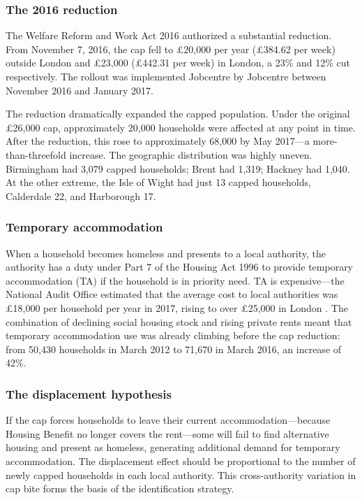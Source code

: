 \documentclass[12pt]{article}
\begin{document}
\subsubsection*{The 2016 reduction} The Welfare Reform and Work Act 2016 authorized a substantial reduction. From November 7, 2016, the cap fell to \pounds20,000 per year (\pounds384.62 per week) outside London and \pounds23,000 (\pounds442.31 per week) in London, a 23\% and 12\% cut respectively. The rollout was implemented Jobcentre by Jobcentre between November 2016 and January 2017.

The reduction dramatically expanded the capped population. Under the original \pounds26,000 cap, approximately 20,000 households were affected at any point in time. After the reduction, this rose to approximately 68,000 by May 2017---a more-than-threefold increase. The geographic distribution was highly uneven. Birmingham had 3,079 capped households; Brent had 1,319; Hackney had 1,040. At the other extreme, the Isle of Wight had just 13 capped households, Calderdale 22, and Harborough 17.

\subsubsection*{Temporary accommodation} When a household becomes homeless and presents to a local authority, the authority has a duty under Part 7 of the Housing Act 1996 to provide temporary accommodation (TA) if the household is in priority need. TA is expensive---the National Audit Office estimated that the average cost to local authorities was \pounds18,000 per household per year in 2017, rising to over \pounds25,000 in London \citep{nao2017homelessness}. The combination of declining social housing stock and rising private rents meant that temporary accommodation use was already climbing before the cap reduction: from 50,430 households in March 2012 to 71,670 in March 2016, an increase of 42\%.

\subsubsection*{The displacement hypothesis} If the cap forces households to leave their current accommodation---because Housing Benefit no longer covers the rent---some will fail to find alternative housing and present as homeless, generating additional demand for temporary accommodation. The displacement effect should be proportional to the number of newly capped households in each local authority. This cross-authority variation in cap bite forms the basis of the identification strategy.
\end{document}
